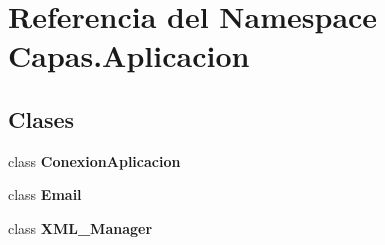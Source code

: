 \section{Referencia del Namespace Capas.\+Aplicacion}
\label{namespace_capas_1_1_aplicacion}
\subsection*{Clases}
\begin{DoxyCompactItemize}
\item 
class {\bf Conexion\+Aplicacion}
\item 
class {\bf Email}
\item 
class {\bf X\+M\+L\+\_\+\+Manager}
\end{DoxyCompactItemize}
